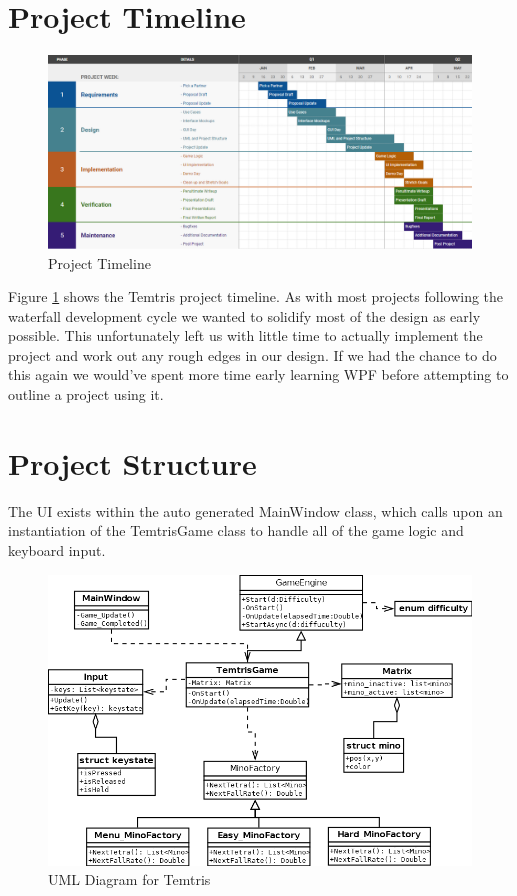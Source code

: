 \documentclass[10pt,conference,onecolumn,compsoc]{IEEEtran}
\begin{document}
\section{Project Timeline}
\begin{figure}[!h]
\includegraphics[scale=.3]{Timeline.png}
\caption{Project Timeline}
\label{fig:timeline}
\end{figure}

Figure \ref{fig:timeline} shows the Temtris project timeline. As with most projects following the waterfall development cycle we wanted to solidify most of the design as early possible. This unfortunately left us with little time to actually implement the project and work out any rough edges in our design. If we had the chance to do this again we would've spent more time early learning WPF before attempting to outline a project using it. 

\section{Project Structure}
The UI exists within the auto generated MainWindow class, which calls upon an instantiation of the TemtrisGame class to handle all of the game logic and keyboard input.

\begin{figure}[!h]
\includegraphics[scale=0.4]{ClassDiagrams.png}
\caption{UML Diagram for Temtris}
\label{fig:uml}
\end{figure}
\end{document}
